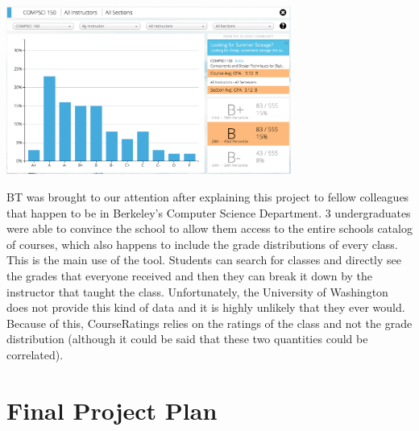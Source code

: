 \documentclass{article}
\begin{document}
\vspace{-3 pt}
\begin{center}
\includegraphics[width=0.7\textwidth]{bt.png}
\end{center}

BT was brought to our attention after explaining this project to fellow colleagues that happen to be in Berkeley's Computer Science Department. 3 undergraduates were able to convince the school to allow them access to the entire schools catalog of courses, which also happens to include the grade distributions of every class. This is the main use of the tool. Students can search for classes and directly see the grades that everyone received and then they can break it down by the instructor that taught the class. Unfortunately, the University of Washington does not provide this kind of data and it is highly unlikely that they ever would. Because of this, CourseRatings relies on the ratings of the class and not the grade distribution (although it could be said that these two quantities could be correlated).

\section*{Final Project Plan}
\end{document}
